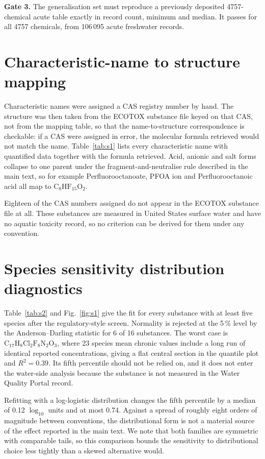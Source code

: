 \documentclass[preprint,11pt]{elsarticle}
\begin{document}
\textbf{Gate 3.} The generalisation set must reproduce a previously deposited
4757-chemical acute table exactly in record count, minimum and median. It passes
for all 4757 chemicals, from 106\,095 acute freshwater records.

\section{Characteristic-name to structure mapping}

Characteristic names were assigned a CAS registry number by hand. The structure
was then taken from the ECOTOX substance file keyed on that CAS, not from the
mapping table, so that the name-to-structure correspondence is checkable: if a
CAS were assigned in error, the molecular formula retrieved would not match the
name. Table~\ref{tab:s1} lists every characteristic name with quantified data
together with the formula retrieved. Acid, anionic and salt forms collapse to
one parent under the fragment-and-neutralise rule described in the main text,
so for example \textsf{Perfluorooctanoate}, \textsf{PFOA ion} and
\textsf{Perfluorooctanoic acid} all map to $\mathrm{C_8HF_{15}O_2}$.

Eighteen of the CAS numbers assigned do not appear in the ECOTOX substance file
at all. These substances are measured in United States surface water and have no
aquatic toxicity record, so no criterion can be derived for them under any
convention.



\clearpage
\section{Species sensitivity distribution diagnostics}

Table~\ref{tab:s2} and Fig.~\ref{fig:s1} give the fit for every substance with
at least five species after the regulatory-style screen. Normality is rejected
at the 5\,\% level by the Anderson--Darling statistic for 6 of 16 substances.
The worst case is $\mathrm{C_{17}H_8Cl_2F_8N_2O_3}$, where 23 species mean
chronic values include a long run of identical reported concentrations, giving a
flat central section in the quantile plot and $R^2 = 0.39$. Its fifth percentile
should not be relied on, and it does not enter the water-side analysis because
the substance is not measured in the Water Quality Portal record.

Refitting with a log-logistic distribution changes the fifth percentile by a
median of 0.12 $\log_{10}$ units and at most 0.74. Against a spread of roughly
eight orders of magnitude between conventions, the distributional form is not a
material source of the effect reported in the main text. We note that both
families are symmetric with comparable tails, so this comparison bounds the
sensitivity to distributional choice less tightly than a skewed alternative
would.
\end{document}
